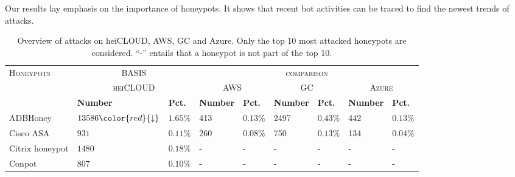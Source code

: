 Our results lay emphasis on the importance of honeypots.
It shows that recent bot activities can be traced to find the newest trends of attacks.

\begin{table}
    \centering
    \caption[Overview of attacks on cloud providers]{Overview of attacks on heiCLOUD, AWS, GC and Azure. Only the top 10 most attacked honeypots are considered. \enquote{-} entails that a honeypot is not part of the top 10.}
    \begin{tabularx}{\linewidth}{l|XX|XX|XX|XX}
        \toprule
        \textsc{Honeypots} & \multicolumn{2}{c}{BASIS}              & \multicolumn{6}{c}{\textsc{comparison}}                                                                                                                                             \\
                           & \multicolumn{2}{c|}{\textsc{heiCLOUD}} & \multicolumn{2}{c|}{\textsc{AWS}}       & \multicolumn{2}{c|}{\textsc{GC}} & \multicolumn{2}{c}{\textsc{Azure}}                                                                     \\
                           & \textbf{Number}                        & \textbf{Pct.}                           & \textbf{Number}                  & \textbf{Pct.}                      & \textbf{Number} & \textbf{Pct.} & \textbf{Number} & \textbf{Pct.} \\
        \hline
        ADBHoney           & $13586 \color{red}{\downarrow}$        & $1.65\%$                                & 413                              & $0.13\%$                           & 2497            & $0.43\%$      & 442             & $0.13\%$      \\
        Cisco ASA          & $931$                                  & $0.11\%$                                & 260                              & $0.08\%$                           & 750             & $0.13\%$      & 134             & $0.04\%$      \\
        Citrix honeypot    & $1480$                                 & $0.18\%$                                & -                                & -                                  & -               & -             & -               & -             \\
        Conpot             & $807$                                  & $0.10\%$                                & -                                & -                                  & -               & -             & -               & -             \\

\end{tabularx}
\end{table}
